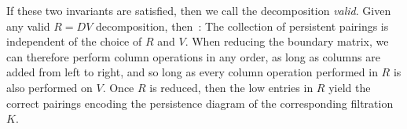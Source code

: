 \documentclass{siamart190516}
\begin{document}
 \vspace*{1em}
 If these two invariants are satisfied, then we call the decomposition \emph{valid}. Given any valid $R = D V$ decomposition, then~\cite{zomorodian2005computing}:
\noindent
The collection of persistent pairings is independent of the choice of $R$ and $V$. When reducing the boundary matrix, we can therefore perform column operations in any order, as long as columns are added from left to right, and so long as every column operation performed in $R$ is also performed on $V$. 
Once $R$ is reduced, then the low entries in $R$ yield the correct pairings encoding the persistence diagram of the corresponding filtration $K$.
\end{document}
